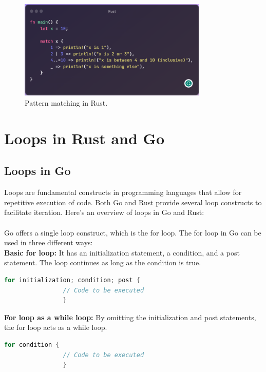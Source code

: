 \documentclass{dclass}
\begin{document}
\begin{figure}[h!]
\begin{center}
\includegraphics[width=9.0cm]{rust_conditions.png}
\caption{Pattern matching in Rust.}
\label{fig1}
\end{center}\vs{-4mm}
\end{figure}

\section{Loops in Rust and Go}
\subsection{Loops in Go}
Loops are fundamental constructs in programming languages that allow for repetitive execution of code. Both Go and Rust provide several loop constructs to facilitate iteration. Here's an overview of loops in Go and Rust:\\\\
Go offers a single loop construct, which is the for loop. The for loop in Go can be used in three different ways:\cite{ref7}\\
\textbf{Basic for loop:} It has an initialization statement, a condition, and a post statement. The loop continues as long as the condition is true.\\
\begin{lstlisting}[language=go,frame=single,]
                for initialization; condition; post {
                // Code to be executed
                }
\end{lstlisting}
\textbf{For loop as a while loop:} By omitting the initialization and post statements, the for loop acts as a while loop.\\
\begin{lstlisting}[language=go,frame=single,]
                for condition {
                // Code to be executed
                }
\end{lstlisting}
\end{document}

